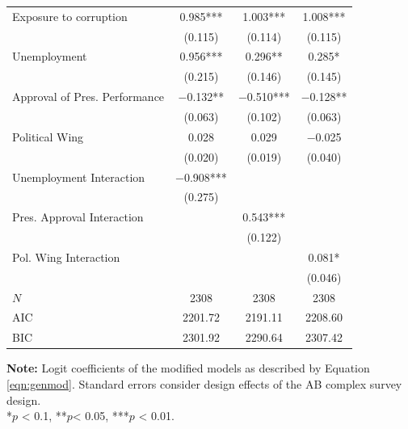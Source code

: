 \documentclass[12pt,a4]{article}\usepackage[]{graphicx}\usepackage[]{xcolor}
\begin{document}
\begin{table}[htbp]
\begin{center}
\begin{tabular}[t]{lccc}
Exposure to corruption & \num{0.985}*** & \num{1.003}*** & \num{1.008}***\\
 & (\num{0.115}) & (\num{0.114}) & (\num{0.115})\\
Unemployment & \num{0.956}*** & \num{0.296}** & \num{0.285}*\\
 & (\num{0.215}) & (\num{0.146}) & (\num{0.145})\\
Approval of Pres. Performance & \num{-0.132}** & \num{-0.510}*** & \num{-0.128}**\\
 & (\num{0.063}) & (\num{0.102}) & (\num{0.063})\\
Political Wing & \num{0.028} & \num{0.029} & \num{-0.025}\\
 & (\num{0.020}) & (\num{0.019}) & (\num{0.040})\\
Unemployment Interaction & \num{-0.908}*** &  & \\
 & (\num{0.275}) &  & \\
Pres. Approval Interaction &  & \num{0.543}*** & \\
 &  & (\num{0.122}) & \\
Pol. Wing Interaction &  &  & \num{0.081}*\\
 &  &  & (\num{0.046})\\
\midrule
$N$ & \num{2308} & \num{2308} & \num{2308}\\
AIC & \num{2201.72} & \num{2191.11} & \num{2208.60}\\
BIC & \num{2301.92} & \num{2290.64} & \num{2307.42}\\
\bottomrule
\end{tabular}


\end{center}
\textbf{Note:} Logit coefficients of the modified models as described by Equation \ref{eqn:genmod}. Standard errors consider design effects of the AB complex survey design.\\
*$p$ < 0.1, **$p$< 0.05, ***$p$ < 0.01.
\end{table}
\end{document}
